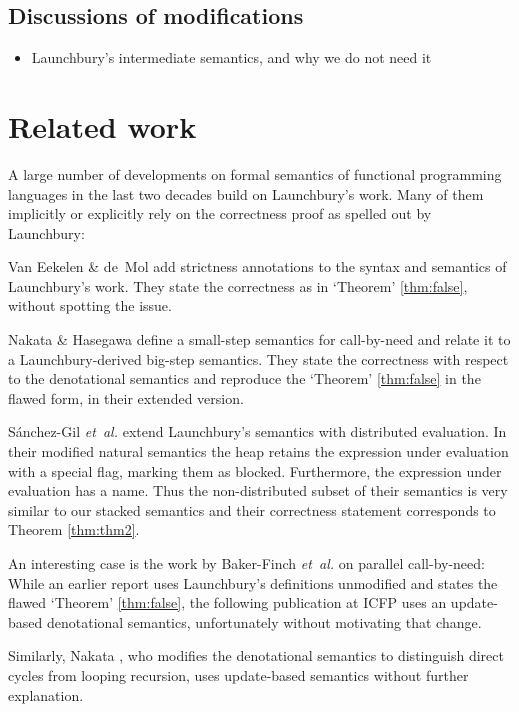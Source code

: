 \documentclass{jfp1}
\theoremstyle{nonumberbreak}
\begin{document}
\subsection{Discussions of modifications}

\begin{itemize}
\item Launchbury’s intermediate semantics, and why we do not need it
\end{itemize}

\section{Related work}

A large number of developments on formal semantics of functional programming languages in the last two decades build on Launchbury’s work. Many of them implicitly or explicitly rely on the correctness proof as spelled out by Launchbury:

Van Eekelen \& de~Mol  add strictness annotations to the syntax and semantics of Launchbury’s work. They state the correctness as in `Theorem' \ref{thm:false}, without spotting the issue.


Nakata \& Hasegawa  define a small-step semantics for call-by-need and relate it to a Launchbury-derived big-step semantics. They state the correctness with respect to the denotational semantics and reproduce the `Theorem' \ref{thm:false} in the flawed form, in their extended version.

S{\'a}nchez-Gil {\em et~al.}  extend Launchbury's semantics with distributed evaluation.  In their modified natural semantics the heap retains the expression under evaluation with a special flag, marking them as blocked. Furthermore, the expression under evaluation has a name. Thus the non-distributed subset of their semantics is very similar to our stacked semantics and their correctness statement corresponds to Theorem \ref{thm:thm2}.

An interesting case is the work by Baker-Finch {\em et~al.} on parallel call-by-need: While an earlier report  uses Launchbury’s definitions unmodified and states the flawed `Theorem' \ref{thm:false}, the following publication at ICFP  uses an update-based denotational semantics, unfortunately without motivating that change.

Similarly, Nakata  , who modifies the denotational semantics to distinguish direct cycles from looping recursion, uses update-based semantics without further explanation. 
\end{document}
